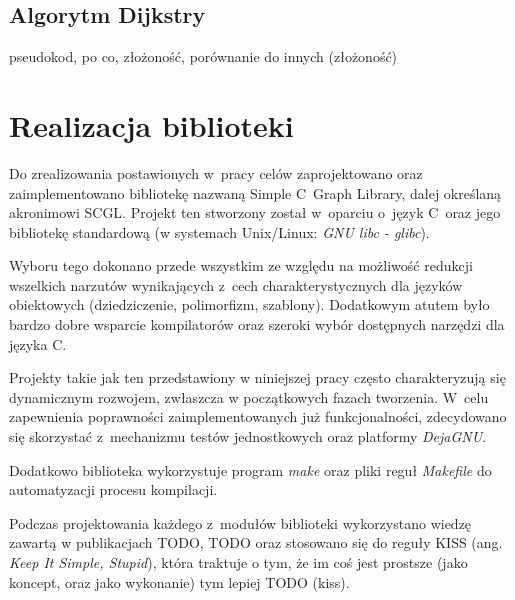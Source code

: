 \documentclass[a4paper,12pt,polish,oneside]{thesis}
\begin{document}
\section{Algorytm Dijkstry}
pseudokod, po co, złożoność, porównanie do innych (złożoność)




\chapter{Realizacja biblioteki}
Do zrealizowania postawionych w~pracy celów zaprojektowano oraz zaimplementowano bibliotekę nazwaną Simple C~Graph Library, dalej określaną akronimowi SCGL.
Projekt ten stworzony został w~oparciu o~język C~oraz jego bibliotekę standardową (w systemach Unix/Linux: \emph{GNU libc - glibc}).

Wyboru tego dokonano przede wszystkim ze względu na możliwość redukcji wszelkich narzutów wynikających z~cech charakterystycznych dla języków obiektowych (dziedziczenie, polimorfizm, szablony).
Dodatkowym atutem było bardzo dobre wsparcie kompilatorów oraz szeroki wybór dostępnych narzędzi dla języka C.

Projekty takie jak ten przedstawiony w niniejszej pracy często charakteryzują się dynamicznym rozwojem, zwłaszcza w początkowych fazach tworzenia.
W~celu zapewnienia poprawności zaimplementowanych już funkcjonalności, zdecydowano się skorzystać z~mechanizmu testów jednostkowych oraz platformy \emph{DejaGNU}.

Dodatkowo biblioteka wykorzystuje program \emph{make} oraz pliki reguł \emph{Makefile} do automatyzacji procesu kompilacji.

Podczas projektowania każdego z~modułów biblioteki wykorzystano wiedzę zawartą w publikacjach TODO, TODO oraz stosowano się do reguły KISS (ang. \emph{Keep It Simple, Stupid}), która traktuje o tym, że im coś jest prostsze (jako koncept, oraz jako wykonanie) tym lepiej TODO (kiss).
\label{kiss}
\end{document}
